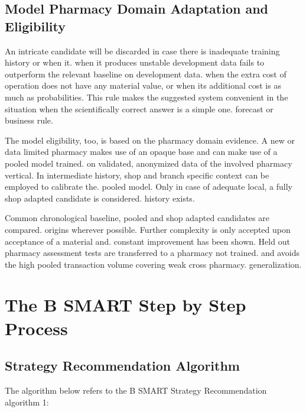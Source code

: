 \documentclass[a4paper,11pt,oneside]{book}
\theoremstyle{plain}
\theoremstyle{definition}
\theoremstyle{remark}
\begin{document}
\subsection{Model Pharmacy Domain Adaptation and Eligibility}

An intricate candidate will be discarded in case there is inadequate training history or when it. when it produces unstable development data fails to outperform the relevant baseline on development data. when the extra cost of operation does not have any material value, or when its additional cost is as much as probabilities. This rule makes the suggested system convenient in the situation when the scientifically correct answer is a simple one. forecast or business rule.

The model eligibility, too, is based on the pharmacy domain evidence. A new or data limited pharmacy makes use of an opaque base and can make use of a pooled model trained. on validated, anonymized data of the involved pharmacy vertical. In intermediate history, shop and branch specific context can be employed to calibrate the. pooled model. Only in case of adequate local, a fully shop adapted candidate is considered. history exists.

Common chronological baseline, pooled and shop adapted candidates are compared. origins wherever possible. Further complexity is only accepted upon acceptance of a material and. constant improvement has been shown. Held out pharmacy assessment tests are transferred to a pharmacy not trained. and avoids the high pooled transaction volume covering weak cross pharmacy. generalization.

\section{The B SMART Step by Step Process}
\label{sec:sequential_procedure}

\subsection{Strategy Recommendation Algorithm}

The algorithm below refers to the B SMART Strategy Recommendation algorithm 1:
\end{document}
